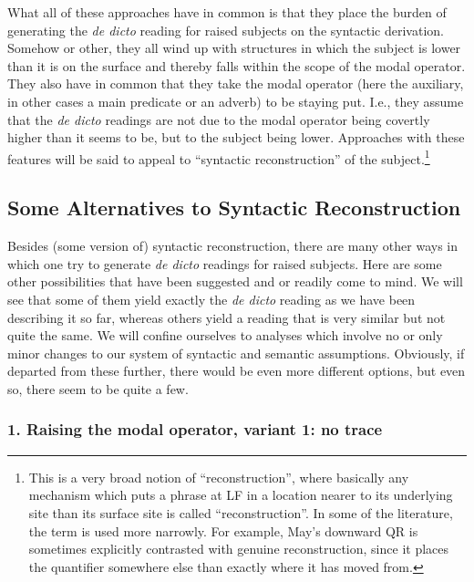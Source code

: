 What all of these approaches have in common is that they place the burden of generating the \emph{de dicto} reading for raised subjects on the syntactic derivation. Somehow or other, they all wind up with structures in which the subject is lower than it is on the surface and thereby falls within the scope of the modal operator. They also have in common that they take the modal operator (here the auxiliary, in other cases a main predicate or an adverb) to be staying put. I.e., they assume that the \emph{de dicto} readings are not due to the modal operator being covertly higher than it seems to be, but to the subject being lower. Approaches with these features will be said to appeal to ``syntactic reconstruction'' of the subject.\footnote{This is a very broad notion of ``reconstruction'', where basically any mechanism which puts a phrase at LF in a location nearer to its underlying site than its surface site is called ``reconstruction''. In some of the literature, the term is used more narrowly. For example, May's downward QR is sometimes explicitly contrasted with genuine reconstruction, since it places the quantifier somewhere else than exactly where it has moved from. }

\subsection{Some Alternatives to Syntactic Reconstruction}\label{sem}

Besides (some version of) syntactic reconstruction, there are many other ways in which one try to generate \emph{de dicto} readings for raised subjects. Here are some other possibilities that have been suggested and or readily come to mind. We will see that some of them yield exactly the \emph{de dicto} reading as we have been describing it so far, whereas others yield a reading that is very similar but not quite the same. We will confine ourselves to analyses which involve no or only minor changes to our system of syntactic and semantic assumptions. Obviously, if departed from these further, there would be even more different options, but even so, there seem to be quite a few.

\subsubsection{1. Raising the modal operator, variant 1: no trace}

